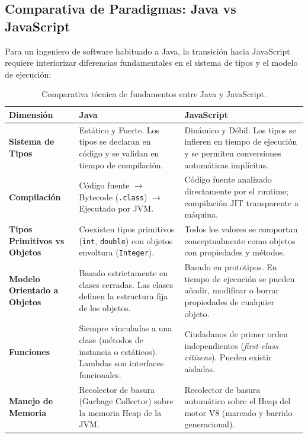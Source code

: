 \subsection{Comparativa de Paradigmas: Java vs JavaScript}

Para un ingeniero de software habituado a Java, la transición hacia JavaScript requiere interiorizar diferencias fundamentales en el sistema de tipos y el modelo de ejecución:

\begin{table}[htbp]
\centering
\small
\begin{tabularx}{\textwidth}{p{3.2cm} X X}
\toprule
\textbf{Dimensión} & \textbf{Java} & \textbf{JavaScript} \\
\midrule
\textbf{Sistema de Tipos} & Estático y Fuerte. Los tipos se declaran en código y se validan en tiempo de compilación. & Dinámico y Débil. Los tipos se infieren en tiempo de ejecución y se permiten conversiones automáticas implícitas. \\
\addlinespace
\textbf{Compilación} & Código fuente $\rightarrow$ Bytecode (\texttt{.class}) $\rightarrow$ Ejecutado por JVM. & Código fuente analizado directamente por el runtime; compilación JIT transparente a máquina. \\
\addlinespace
\textbf{Tipos Primitivos vs Objetos} & Coexisten tipos primitivos (\texttt{int}, \texttt{double}) con objetos envoltura (\texttt{Integer}). & Todos los valores se comportan conceptualmente como objetos con propiedades y métodos. \\
\addlinespace
\textbf{Modelo Orientado a Objetos} & Basado estrictamente en clases cerradas. Las clases definen la estructura fija de los objetos. & Basado en prototipos. En tiempo de ejecución se pueden añadir, modificar o borrar propiedades de cualquier objeto. \\
\addlinespace
\textbf{Funciones} & Siempre vinculadas a una clase (métodos de instancia o estáticos). Lambdas son interfaces funcionales. & Ciudadanos de primer orden independientes (\emph{first-class citizens}). Pueden existir aisladas. \\
\addlinespace
\textbf{Manejo de Memoria} & Recolector de basura (Garbage Collector) sobre la memoria Heap de la JVM. & Recolector de basura automático sobre el Heap del motor V8 (marcado y barrido generacional). \\
\bottomrule
\end{tabularx}
\caption{Comparativa técnica de fundamentos entre Java y JavaScript.}
\label{tab:java-vs-js}
\end{table}

